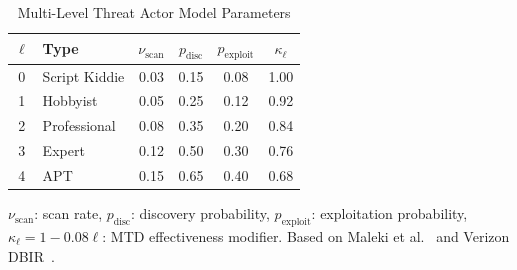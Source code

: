 \begin{table}[!t]
\centering
\caption{Multi-Level Threat Actor Model Parameters}
\label{tab:attacker_profiles}
\renewcommand{\arraystretch}{1.1}
\begin{tabular}{@{}clcccc@{}}
\toprule
$\ell$ & \textbf{Type} & $\nu_{\text{scan}}$ & $p_{\text{disc}}$ & $p_{\text{exploit}}$ & $\kappa_\ell$ \\
\midrule
0 & Script Kiddie & 0.03 & 0.15 & 0.08 & 1.00 \\
1 & Hobbyist & 0.05 & 0.25 & 0.12 & 0.92 \\
2 & Professional & 0.08 & 0.35 & 0.20 & 0.84 \\
3 & Expert & 0.12 & 0.50 & 0.30 & 0.76 \\
4 & APT & 0.15 & 0.65 & 0.40 & 0.68 \\
\bottomrule
\end{tabular}
\vspace{1mm}
\footnotesize{$\nu_{\text{scan}}$: scan rate, $p_{\text{disc}}$: discovery probability, $p_{\text{exploit}}$: exploitation probability, $\kappa_\ell = 1 - 0.08\ell$: MTD effectiveness modifier. Based on Maleki et al.~\cite{maleki2016markov} and Verizon DBIR~\cite{verizon_dbir}.}
\end{table}
